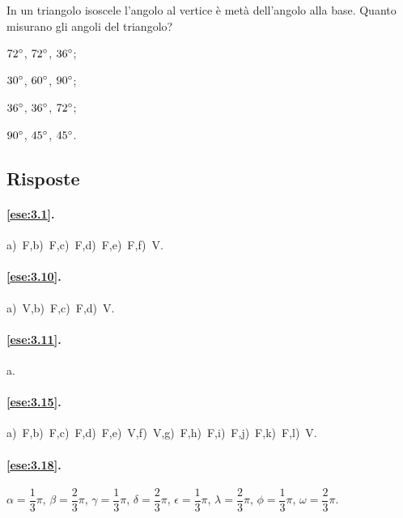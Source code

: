 \begin{esercizio}
\label{ese:3.117}
In un triangolo isoscele l'angolo al vertice è metà dell'angolo alla base. Quanto misurano gli angoli del triangolo?
\begin{multicols}{4}
\begin{enumeratea}
\item $72{}^{\circ}$, $72{}^{\circ}$, $36{}^{\circ}$;
\item $30{}^{\circ}$, $60{}^{\circ}$, $90{}^{\circ}$;
\item $36{}^{\circ}$, $36{}^{\circ}$, $72{}^{\circ}$;
\item $90{}^{\circ}$, $45{}^{\circ}$, $45{}^{\circ}$.
\end{enumeratea}
\end{multicols}
\end{esercizio}



\subsection{Risposte}

\begingroup
\hypersetup{linkcolor=black}

\paragraph{\ref{ese:3.1}.}
a)~F,\quad b)~F,\quad c)~F,\quad d)~F,\quad e)~F,\quad f)~V.

\paragraph{\ref{ese:3.10}.}
a)~V,\quad b)~F,\quad c)~F,\quad d)~V.

\paragraph{\ref{ese:3.11}.}
a.

\paragraph{\ref{ese:3.15}.}
a)~F,\quad b)~F,\quad c)~F,\quad d)~F,\quad e)~V,\quad f)~V,\quad g)~F,\quad h)~F,\quad i)~F,\quad j)~F,\quad k)~F,\quad l)~V.

\paragraph{\ref{ese:3.18}.}
$\alpha=\dfrac{1}{3}\pi$, $\beta=\dfrac{2}{3}\pi$, $\gamma=\dfrac{1}{3}\pi$, $\delta=\dfrac{2}{3}\pi$, $\epsilon=\dfrac{1}{3}\pi$, $\lambda=\dfrac{2}{3}\pi$, $\phi=\dfrac{1}{3}\pi$, $\omega=\dfrac{2}{3}\pi$.

